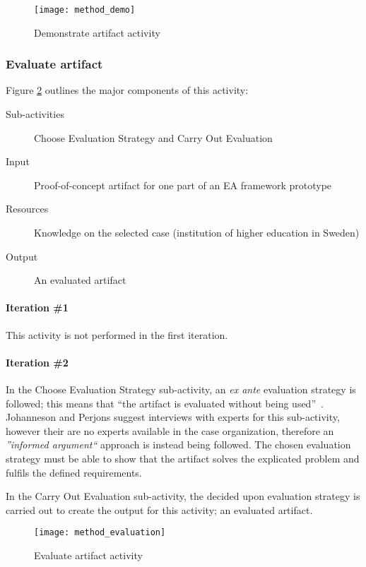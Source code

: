 \begin{figure}
\texttt{[image: method\_demo]}
\caption{Demonstrate artifact activity}
\label{fig:method_demo}
\end{figure}

\subsubsection*{Evaluate artifact}

Figure \ref{fig:method_eval} outlines the major components of this activity:
\begin{description}
  \item[Sub-activities] Choose Evaluation Strategy and Carry Out Evaluation~\cite[Ch. 8]{johannessonPerjons2012}
  \item[Input] Proof-of-concept artifact for one part of an EA framework prototype
  \item[Resources]  Knowledge on the selected case (institution of higher education in Sweden)
  \item[Output] An evaluated artifact
\end{description}

\paragraph{Iteration \#1}

This activity is not performed in the first iteration. 

\paragraph{Iteration \#2}

In the Choose Evaluation Strategy sub-activity, an \textit{ex ante} evaluation strategy is followed; this means that ``the artifact is evaluated without being used''~\cite[Ch. 9.1]{johannessonPerjons2012}. Johanneson and Perjons suggest interviews with experts for this sub-activity, however their are no experts available in the case organization, therefore an \textit{''informed argument``} approach is instead being followed. The chosen evaluation strategy must be able to show that the artifact solves the explicated problem and fulfils the defined requirements.

In the Carry Out Evaluation sub-activity, the decided upon evaluation strategy is carried out to create the output for this activity; an evaluated artifact. 

\begin{figure}
\texttt{[image: method\_evaluation]}
\caption{Evaluate artifact activity}
\label{fig:method_eval}
\end{figure}


